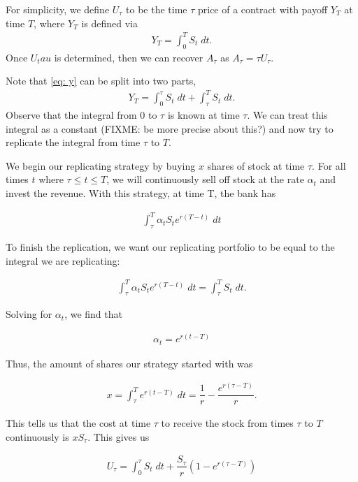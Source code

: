 \documentclass[reqno]{amsart}
\begin{document}
For simplicity, we define $U_\tau$ to be the time $\tau$ price of a contract with payoff $Y_T$ at time $T$, where $Y_T$ is defined via
\begin{align}\label{eq: y}
     Y_T = \int_0^T S_t \; dt.
\end{align}
Once $U_tau$ is determined, then we can recover $A_\tau$ as $A_\tau = \tau U_\tau$. 

Note that \eqref{eq: y} can be split into
two parts, 
\begin{align}
     Y_T = \int_0^\tau S_t \; dt + \int_\tau^T S_t \; dt.
\end{align}
Observe that the integral from $0$ to $\tau$ is known at time $\tau$. We can treat this integral as a constant (FIXME: be more precise about this?) and now try to replicate the integral from time $\tau$ to $T$.

We begin our replicating strategy by buying $x$ shares of stock at time $\tau$. For all times $t$ where $\tau \leq t \leq T$, we will continuously sell off stock at the rate $\alpha_t$ and invest the revenue.
With this strategy, at time T, the bank has 

\begin{align}
     \int_\tau^T \alpha_t S_t e^{r(T-t)} \; dt
\end{align}

To finish the replication, we want our replicating portfolio to be equal to the integral we are replicating:

\begin{align}
     \int_\tau^T \alpha_t S_t e^{r(T-t)} \; dt = \int_\tau^T S_t \; dt.
\end{align}

Solving for $\alpha_t$, we find that

\begin{align}
     \alpha_t = e^{r(t-T)}
\end{align}

Thus, the amount of shares our strategy started with was

\begin{align}
     x = \int_\tau^T e^{r(t-T)} \; dt = \dfrac{1}{r} - \dfrac{e^{r(\tau - T)}}{r}.
\end{align}

This tells us that the cost at time $\tau$ to receive the stock from times $\tau$ to $T$ continuously is $x S_\tau$. This gives us 

\begin{align}
     U_\tau = \int_0^\tau S_t \; dt + \dfrac{S_\tau}{r}\left( 1 - e^{r(\tau - T)} \right)
\end{align}
\end{document}
